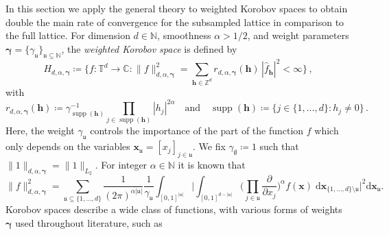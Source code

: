 \documentclass[a4paper]{amsart}
\renewcommand{\hat}{\widehat}
\DeclareMathOperator{\Supp}{supp}
\begin{document}
In this section we apply the general theory to weighted Korobov spaces to obtain double the main rate of convergence for the subsampled lattice in comparison to the full lattice.
For dimension $d\in\mathds N$, smoothness $\alpha > 1/2$, and weight parameters $\bm\gamma = \{\gamma_{\mathfrak u}\}_{\mathfrak u\subseteq\mathds N}$, the \emph{weighted Korobov space} is defined by
\begin{equation}\label{eq:korobov}
    H_{d,\alpha,\bm\gamma}
    \coloneqq \Big\{
        f\colon\mathds T^d\to\mathds C :
        \|f\|_{d,\alpha,\bm\gamma}^2
        = \sum_{\bm h\in\mathds Z^d} r_{d,\alpha,\bm\gamma}(\bm h) \, |\hat f_{\bm h}|^2
        < \infty
    \Big\} \,,
\end{equation}
with
\begin{equation}\label{eq:rgamma}
    r_{d,\alpha,\bm\gamma}(\bm h)
    \coloneqq \gamma_{\Supp(\bm h)}^{-1} \prod_{j\in\Supp(\bm h)} |h_j|^{2\alpha}
    \quad\text{and}\quad
    \Supp(\bm h) \coloneqq \Big\{ j \in\{1,\dots,d\} : h_j\neq 0 \Big\} \,.
\end{equation}
Here, the weight $\gamma_{\mathfrak u}$ controls the importance of the part of the function $f$ which only depends on the variables $\bm x_{\mathfrak u} = [x_j]_{j\in\mathfrak u}$.
We fix $\gamma_{\emptyset} \coloneqq 1$ such that $\|1\|_{d,\alpha,\bm\gamma} = \|1\|_{L_2}$.
For integer $\alpha\in\mathds N$ it is known that
\begin{equation*}
    \|f\|_{d,\alpha,\bm\gamma}^2
    =\!\! \sum_{\mathfrak u\subseteq \{1, \dots, d\}}
    \!\frac{1}{(2\pi)^{\alpha|\mathfrak u|}}
    \frac{1}{\gamma_{\mathfrak u}}
    \int_{[0,1]^{|\mathfrak u|}}
    \!\Big|
    \int_{[0,1]^{d-|\mathfrak u|}}
    \!\Big(\prod_{j\in\mathfrak u} \frac{\partial}{\partial x_j}\Big)^\alpha
    f(\bm x)
    \;\mathrm d\bm x_{\{1, \dots, d\}\setminus\mathfrak u}
    \Big|^2
    \mathrm d\bm x_{\mathfrak u} .
\end{equation*}
Korobov spaces describe a wide class of functions, with various forms of weights $\bm\gamma$ used throughout literature, such as
\end{document}
